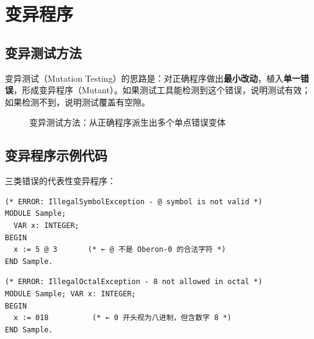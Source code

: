 \documentclass[12pt,a4paper,fontset=none]{ctexart}
\begin{document}
\section{变异程序}

\subsection{变异测试方法}

变异测试（Mutation Testing）的思路是：对正确程序做出\textbf{最小改动}，植入\textbf{单一错误}，形成变异程序（Mutant）。如果测试工具能检测到这个错误，说明测试有效；如果检测不到，说明测试覆盖有空隙。

\begin{figure}[H]\centering
{}
\caption{变异测试方法：从正确程序派生出多个单点错误变体}
\label{fig:mutation}
\end{figure}

\subsection{变异程序示例代码}

三类错误的代表性变异程序：

\begin{lstlisting}[style=oberoncode,caption={词法错误：非法符号（Sample.001）}]
(* ERROR: IllegalSymbolException - @ symbol is not valid *)
MODULE Sample;
  VAR x: INTEGER;
BEGIN
  x := 5 @ 3       (* ← @ 不是 Oberon-0 的合法字符 *)
END Sample.
\end{lstlisting}

\begin{lstlisting}[style=oberoncode,caption={词法错误：八进制非法数字（Sample.005）}]
(* ERROR: IllegalOctalException - 8 not allowed in octal *)
MODULE Sample; VAR x: INTEGER;
BEGIN
  x := 018          (* ← 0 开头视为八进制，但含数字 8 *)
END Sample.
\end{lstlisting}
\end{document}
